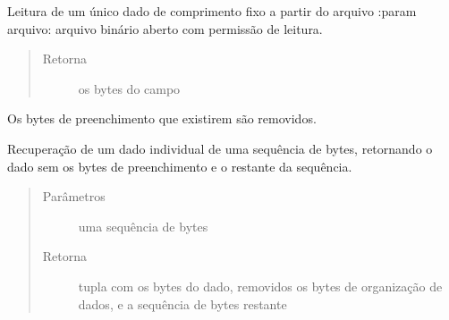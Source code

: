 \documentclass[letterpaper,10pt,brazil]{sphinxmanual}
\begin{document}
\begin{fulllineitems}
\begin{fulllineitems}
\label{\detokenize{estrutarq.dado:estrutarq.dado.DadoFixo.leia_de_arquivo}}
\pysigstartsignatures
{}
\pysigstopsignatures
\sphinxAtStartPar
Leitura de um único dado de comprimento fixo a partir do arquivo
:param arquivo: arquivo binário aberto com permissão de leitura.
\begin{quote}\begin{description}
\item[{Retorna}] \leavevmode
\sphinxAtStartPar
os bytes do campo

\end{description}\end{quote}

\sphinxAtStartPar
Os bytes de preenchimento que existirem são removidos.

\end{fulllineitems}


\begin{fulllineitems}
\label{\detokenize{estrutarq.dado:estrutarq.dado.DadoFixo.leia_de_bytes}}
\pysigstartsignatures
{}
\pysigstopsignatures
\sphinxAtStartPar
Recuperação de um dado individual de uma sequência de bytes,
retornando o dado sem os bytes de preenchimento e o restante da
sequência.
\begin{quote}\begin{description}
\item[{Parâmetros}] \leavevmode
\sphinxAtStartPar
{} \textendash{} uma sequência de bytes

\item[{Retorna}] \leavevmode
\sphinxAtStartPar
tupla com os bytes do dado, removidos os bytes de organização
de dados, e a sequência de bytes restante


\end{description}
\end{quote}
\end{fulllineitems}
\end{fulllineitems}
\end{document}
